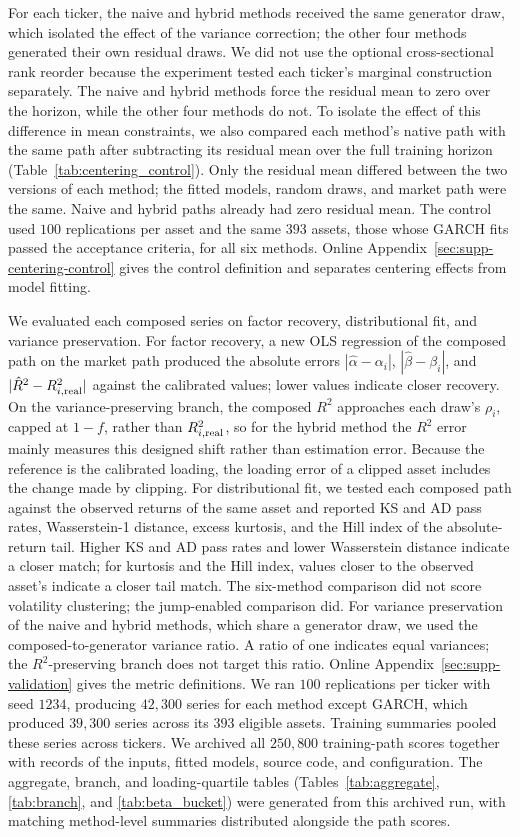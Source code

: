For each ticker, the naive and hybrid methods received the same
generator draw, which isolated the effect of the variance correction;
the other four methods generated their own residual draws. We did not
use the optional cross-sectional rank reorder because the experiment
tested each ticker's marginal construction separately. The naive and
hybrid methods force the residual mean to zero over the horizon,
while the other four methods do not. To isolate the effect of this
difference in mean constraints, we also compared each method's native
path with the same path after subtracting its residual mean over the
full training horizon (Table~\ref{tab:centering_control}). Only the residual mean differed between the two versions of each
method; the fitted models, random draws, and market path were the
same. Naive and hybrid
paths already had zero residual mean. The control used $100$
replications per asset and the same $393$ assets, those whose GARCH fits passed the acceptance
criteria, for all six methods. Online
Appendix~\ref{sec:supp-centering-control} gives the control definition
and separates centering effects from model fitting.

We evaluated each composed series on factor recovery, distributional
fit, and variance preservation. For factor recovery, a new OLS
regression of the composed path on the market path produced the
absolute errors $|\hat\alpha-\alpha_i|$, $|\hat\beta-\beta_i|$, and
$|\hat R^2-R^2_{i,\mathrm{real}}|$
against the calibrated values; lower values indicate closer recovery.
On the variance-preserving branch, the composed $R^2$ approaches each
draw's $\rho_i$, capped at $1-f$, rather than $R^2_{i,\mathrm{real}}$, so for
the hybrid method the $R^2$ error mainly measures this designed shift
rather than estimation error.
Because the reference is the calibrated loading, the loading error of
a clipped asset includes the change made by clipping. For distributional fit, we tested each composed path against the
observed returns of the same asset and reported KS and AD pass rates,
Wasserstein-1 distance, excess kurtosis, and the Hill index of the
absolute-return tail. Higher KS and AD pass rates and lower Wasserstein distance indicate a
closer match; for kurtosis and the Hill index, values closer to the observed asset's indicate a closer tail
match. The six-method comparison did not score volatility clustering;
the jump-enabled comparison did. For variance preservation of the naive and hybrid methods, which share
a generator draw, we used the composed-to-generator variance ratio. A
ratio of one indicates equal variances; the $R^2$-preserving branch
does not target this ratio.
Online Appendix~\ref{sec:supp-validation} gives the metric definitions.
We ran $100$ replications per ticker with seed $1234$, producing $42{,}300$ series for each method except GARCH, which
produced $39{,}300$ series across its $393$ eligible assets. Training
summaries pooled these series across tickers.
We archived all $250{,}800$ training-path scores together with records
of the inputs, fitted models, source code, and configuration. The
aggregate, branch, and loading-quartile tables
(Tables~\ref{tab:aggregate}, \ref{tab:branch}, and
\ref{tab:beta_bucket}) were generated from this archived run, with matching method-level summaries distributed
alongside the path scores.

